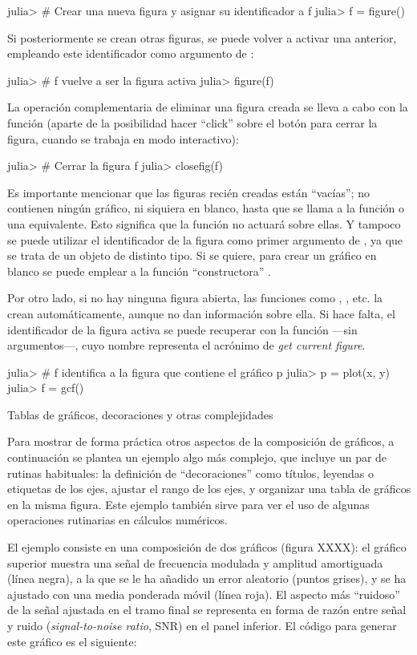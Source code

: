 ﻿\documentclass[spanish]{article}
\begin{document}
julia> # Crear una nueva figura y asignar su identificador a f
julia> f = figure()

Si posteriormente se crean otras figuras, se puede volver a activar una
anterior, empleando este identificador como argumento de :

julia> # f vuelve a ser la figura activa
julia> figure(f)

La operación complementaria de eliminar una figura creada se lleva a cabo
con la función  (aparte de la posibilidad hacer ``click''
sobre el botón para cerrar la figura, cuando se trabaja en modo interactivo):

julia> # Cerrar la figura f
julia> closefig(f)

Es importante mencionar que las figuras recién creadas están
``vacías''; no contienen ningún gráfico, ni siquiera en blanco, hasta
que se llama a la función  o una equivalente. Esto significa que
la función  no actuará sobre ellas. Y tampoco se puede utilizar
el identificador de la figura como primer argumento de , ya que
se trata de un objeto de distinto tipo. Si se quiere, para crear un gráfico
en blanco se puede emplear a la función ``constructora'' .

Por otro lado, si no hay ninguna figura abierta, las funciones como
, , etc. la crean automáticamente, aunque
no dan información sobre ella. Si hace falta, el identificador
de la figura activa se puede recuperar con la función  ---sin
argumentos---, cuyo nombre representa el acrónimo de \emph{get current figure}.

julia> # f identifica a la figura que contiene el gráfico p
julia> p = plot(x, y)
julia> f = gcf()


Tablas de gráficos, decoraciones y otras complejidades

Para mostrar de forma práctica otros aspectos de la composición de gráficos,
a continuación se plantea un ejemplo algo más complejo, que incluye un par de
rutinas habituales: la definición de ``decoraciones''
como títulos, leyendas o etiquetas de los ejes, ajustar el rango de los ejes, y
organizar una tabla de gráficos en la misma figura. Este ejemplo también
sirve para ver el uso de algunas operaciones rutinarias en cálculos numéricos.

El ejemplo consiste en una composición de dos gráficos (figura XXXX):
el gráfico superior muestra una señal de
frecuencia modulada y amplitud amortiguada (línea negra), a la que se le ha
añadido un error aleatorio (puntos grises), y se ha ajustado con una media
ponderada móvil (línea roja). El aspecto más ``ruidoso'' de la señal ajustada en el
tramo final se representa en forma de razón entre señal y ruido
(\emph{signal-to-noise ratio}, SNR) en el panel inferior. El código para
generar este gráfico es el siguiente:
\end{document}
